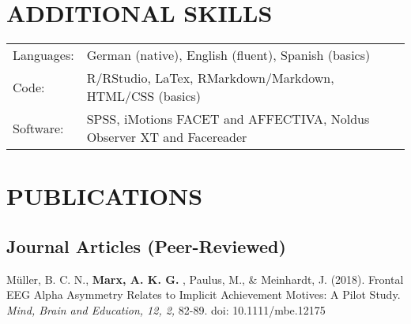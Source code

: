 \documentclass[letterpaper]{article}
\renewenvironment{itemize}{ %
  \begin{list}{}{ %
    \setlength{\leftmargin}{2.5em} %
  }
}{
  \end{list}
}
\begin{document}
\section*{ADDITIONAL SKILLS}
  \begin{tabular}{ll}
    Languages: & German (native), English (fluent), Spanish (basics) \\
    Code: & R/RStudio, LaTex, RMarkdown/Markdown, HTML/CSS (basics) \\
    Software: & SPSS, iMotions FACET and AFFECTIVA, Noldus Observer XT and Facereader
    \end{tabular}

\section*{PUBLICATIONS}
\subsection*{Journal Articles (Peer-Reviewed)}
\begin{itemize}
\item Müller, B. C. N.,  {\bf Marx, A. K. G. }, Paulus, M., \& Meinhardt, J. (2018). Frontal EEG Alpha Asymmetry Relates to Implicit Achievement Motives: A Pilot Study. {\it Mind, Brain and Education, 12, 2,} 82-89. doi: 10.1111/mbe.12175 
\end{itemize}
\end{document}
